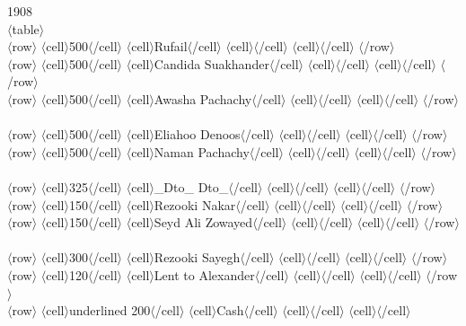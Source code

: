 \documentclass{report}
\begin{document}
	\par{
 	1908\ \\$\langle$table$\rangle$\ \\$\langle$row$\rangle$ $\langle$cell$\rangle$500$\langle$/cell$\rangle$ $\langle$cell$\rangle$Rufail$\langle$/cell$\rangle$ $\langle$cell$\rangle$$\langle$/cell$\rangle$ $\langle$cell$\rangle$$\langle$/cell$\rangle$ $\langle$/row$\rangle$\ \\$\langle$row$\rangle$ $\langle$cell$\rangle$500$\langle$/cell$\rangle$ $\langle$cell$\rangle$Candida Suakhander$\langle$/cell$\rangle$ $\langle$cell$\rangle$$\langle$/cell$\rangle$ $\langle$cell$\rangle$$\langle$/cell$\rangle$ $\langle$/row$\rangle$\ \\$\langle$row$\rangle$ $\langle$cell$\rangle$500$\langle$/cell$\rangle$ $\langle$cell$\rangle$Awasha Pachachy$\langle$/cell$\rangle$ $\langle$cell$\rangle$$\langle$/cell$\rangle$ $\langle$cell$\rangle$$\langle$/cell$\rangle$ $\langle$/row$\rangle$\ \\$\langle$row$\rangle$ $\langle$cell$\rangle$500$\langle$/cell$\rangle$ $\langle$cell$\rangle$Eliahoo Denoos$\langle$/cell$\rangle$ $\langle$cell$\rangle$$\langle$/cell$\rangle$ $\langle$cell$\rangle$$\langle$/cell$\rangle$ $\langle$/row$\rangle$\ \\$\langle$row$\rangle$ $\langle$cell$\rangle$500$\langle$/cell$\rangle$ $\langle$cell$\rangle$Naman Pachachy$\langle$/cell$\rangle$ $\langle$cell$\rangle$$\langle$/cell$\rangle$ $\langle$cell$\rangle$$\langle$/cell$\rangle$ $\langle$/row$\rangle$\ \\$\langle$row$\rangle$ $\langle$cell$\rangle$325$\langle$/cell$\rangle$ $\langle$cell$\rangle$\_Dto\_ Dto\_$\langle$/cell$\rangle$ $\langle$cell$\rangle$$\langle$/cell$\rangle$ $\langle$cell$\rangle$$\langle$/cell$\rangle$ $\langle$/row$\rangle$\ \\$\langle$row$\rangle$ $\langle$cell$\rangle$150$\langle$/cell$\rangle$ $\langle$cell$\rangle$Rezooki Nakar$\langle$/cell$\rangle$ $\langle$cell$\rangle$$\langle$/cell$\rangle$ $\langle$cell$\rangle$$\langle$/cell$\rangle$ $\langle$/row$\rangle$\ \\$\langle$row$\rangle$ $\langle$cell$\rangle$150$\langle$/cell$\rangle$ $\langle$cell$\rangle$Seyd Ali Zowayed$\langle$/cell$\rangle$ $\langle$cell$\rangle$$\langle$/cell$\rangle$ $\langle$cell$\rangle$$\langle$/cell$\rangle$ $\langle$/row$\rangle$\ \\$\langle$row$\rangle$ $\langle$cell$\rangle$300$\langle$/cell$\rangle$ $\langle$cell$\rangle$Rezooki Sayegh$\langle$/cell$\rangle$ $\langle$cell$\rangle$$\langle$/cell$\rangle$ $\langle$cell$\rangle$$\langle$/cell$\rangle$ $\langle$/row$\rangle$\ \\$\langle$row$\rangle$ $\langle$cell$\rangle$120$\langle$/cell$\rangle$ $\langle$cell$\rangle$Lent to Alexander$\langle$/cell$\rangle$ $\langle$cell$\rangle$$\langle$/cell$\rangle$ $\langle$cell$\rangle$$\langle$/cell$\rangle$ $\langle$/row$\rangle$\ \\$\langle$row$\rangle$ $\langle$cell$\rangle$\lbrack underlined 200\rbrack $\langle$/cell$\rangle$ $\langle$cell$\rangle$Cash$\langle$/cell$\rangle$ $\langle$cell$\rangle$$\langle$/cell$\rangle$ $\langle$cell$\rangle$$\langle$/cell$\rangle$ }
\end{document}
